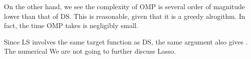 On the other hand, we see the complexity of OMP is several order of magnitude lower than that of DS.
This is reasonable, given that it is a greedy alrogithm.
In fact, the time OMP takes is negligibly small.

Since LS involves the same target function as DS, the same argument also gives .
The numerical 
We are not going to further discuss Lasso.


\stopsubsection

\stopsection

\stopchapter
